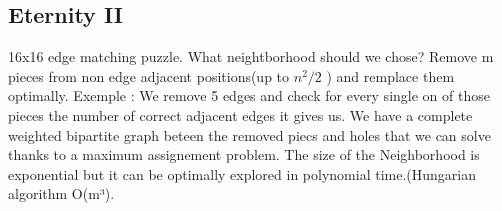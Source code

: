 \subsection{Eternity II}
16x16 edge matching puzzle.\newline
What neightborhood should we chose?\newline
Remove m pieces from non edge adjacent positions(up to $n^2/2$ ) and remplace them optimally. \newline
Exemple : We remove 5 edges and check for every single on of those pieces the number of correct adjacent edges it gives us. We have a complete weighted bipartite graph beteen the removed piecs and holes that we can solve thanks to a maximum assignement problem.
The size of the Neighborhood is exponential but it can be optimally explored in polynomial time.(Hungarian algorithm O(m³).
